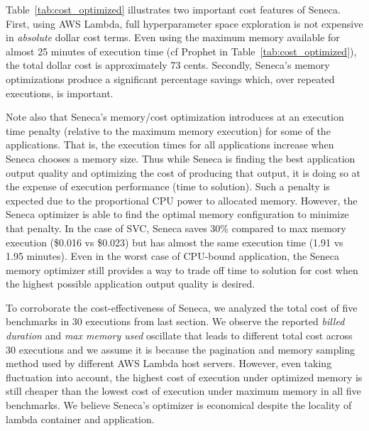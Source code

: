 Table~\ref{tab:cost_optimized} illustrates two important cost features of Seneca.  First, using
AWS Lambda, full hyperparameter space exploration is not expensive in 
\textit{absolute} dollar cost terms.  Even using the maximum memory available
for almost 25 minutes of execution time (cf Prophet in Table~\ref{tab:cost_optimized}), the
total dollar cost is approximately 73 cents.  Secondly, Seneca's memory
optimizations produce a significant percentage savings which, over repeated
executions, is important.  

Note also that Seneca's memory/cost optimization
introduces at an execution time penalty (relative to the maximum memory
execution) for some of the applications.  That is, the
execution times for all applications increase when Seneca chooses
a memory size.  Thus while Seneca is finding the best application output
quality and optimizing the cost of producing that output, it is doing so at
the expense of execution performance (time to solution). Such a penalty
is expected due to the proportional CPU power to allocated
memory. However, the Seneca optimizer is able to find the optimal
memory configuration to minimize that  penalty. In the case of SVC, Seneca saves 30\% compared to max memory execution (\$0.016 vs \$0.023) but has almost the same execution time (1.91 vs 1.95 minutes).
Even in the worst case of CPU-bound application, the Seneca memory optimizer still provides a way to trade off time to solution for cost when the highest possible application output quality is desired.

To corroborate the cost-effectiveness of Seneca, we analyzed the total cost of five benchmarks in 30 executions from last section. We observe the reported \textit{billed duration} and \textit{max memory used} oscillate that leads to different total cost across 30 executions and we assume it is because the pagination and memory sampling method used by different AWS Lambda host servers. However, even taking fluctuation into account, the highest cost of execution under optimized memory is still cheaper than the lowest cost of execution under maximum memory in all five benchmarks. We believe Seneca's optimizer is economical despite the locality of lambda container and application.


